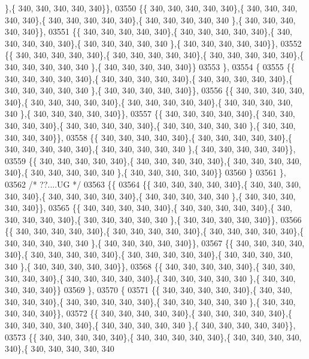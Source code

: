 \begin{DoxyCode}
      \},\{ 340, 340, 340, 340, 340\}\},
03550 \{\{ 340, 340, 340, 340, 340\},\{ 340, 340, 340, 340, 340\},\{ 340, 340, 340, 340, 340\},\{ 340, 340, 340, 340, 340
      \},\{ 340, 340, 340, 340, 340\}\},
03551 \{\{ 340, 340, 340, 340, 340\},\{ 340, 340, 340, 340, 340\},\{ 340, 340, 340, 340, 340\},\{ 340, 340, 340, 340, 340
      \},\{ 340, 340, 340, 340, 340\}\},
03552 \{\{ 340, 340, 340, 340, 340\},\{ 340, 340, 340, 340, 340\},\{ 340, 340, 340, 340, 340\},\{ 340, 340, 340, 340, 340
      \},\{ 340, 340, 340, 340, 340\}\}
03553 \},
03554 \{
03555 \{\{ 340, 340, 340, 340, 340\},\{ 340, 340, 340, 340, 340\},\{ 340, 340, 340, 340, 340\},\{ 340, 340, 340, 340, 340
      \},\{ 340, 340, 340, 340, 340\}\},
03556 \{\{ 340, 340, 340, 340, 340\},\{ 340, 340, 340, 340, 340\},\{ 340, 340, 340, 340, 340\},\{ 340, 340, 340, 340, 340
      \},\{ 340, 340, 340, 340, 340\}\},
03557 \{\{ 340, 340, 340, 340, 340\},\{ 340, 340, 340, 340, 340\},\{ 340, 340, 340, 340, 340\},\{ 340, 340, 340, 340, 340
      \},\{ 340, 340, 340, 340, 340\}\},
03558 \{\{ 340, 340, 340, 340, 340\},\{ 340, 340, 340, 340, 340\},\{ 340, 340, 340, 340, 340\},\{ 340, 340, 340, 340, 340
      \},\{ 340, 340, 340, 340, 340\}\},
03559 \{\{ 340, 340, 340, 340, 340\},\{ 340, 340, 340, 340, 340\},\{ 340, 340, 340, 340, 340\},\{ 340, 340, 340, 340, 340
      \},\{ 340, 340, 340, 340, 340\}\}
03560 \}
03561 \},
03562 \textcolor{comment}{/* ??....UG */}
03563 \{\{
03564 \{\{ 340, 340, 340, 340, 340\},\{ 340, 340, 340, 340, 340\},\{ 340, 340, 340, 340, 340\},\{ 340, 340, 340, 340, 340
      \},\{ 340, 340, 340, 340, 340\}\},
03565 \{\{ 340, 340, 340, 340, 340\},\{ 340, 340, 340, 340, 340\},\{ 340, 340, 340, 340, 340\},\{ 340, 340, 340, 340, 340
      \},\{ 340, 340, 340, 340, 340\}\},
03566 \{\{ 340, 340, 340, 340, 340\},\{ 340, 340, 340, 340, 340\},\{ 340, 340, 340, 340, 340\},\{ 340, 340, 340, 340, 340
      \},\{ 340, 340, 340, 340, 340\}\},
03567 \{\{ 340, 340, 340, 340, 340\},\{ 340, 340, 340, 340, 340\},\{ 340, 340, 340, 340, 340\},\{ 340, 340, 340, 340, 340
      \},\{ 340, 340, 340, 340, 340\}\},
03568 \{\{ 340, 340, 340, 340, 340\},\{ 340, 340, 340, 340, 340\},\{ 340, 340, 340, 340, 340\},\{ 340, 340, 340, 340, 340
      \},\{ 340, 340, 340, 340, 340\}\}
03569 \},
03570 \{
03571 \{\{ 340, 340, 340, 340, 340\},\{ 340, 340, 340, 340, 340\},\{ 340, 340, 340, 340, 340\},\{ 340, 340, 340, 340, 340
      \},\{ 340, 340, 340, 340, 340\}\},
03572 \{\{ 340, 340, 340, 340, 340\},\{ 340, 340, 340, 340, 340\},\{ 340, 340, 340, 340, 340\},\{ 340, 340, 340, 340, 340
      \},\{ 340, 340, 340, 340, 340\}\},
03573 \{\{ 340, 340, 340, 340, 340\},\{ 340, 340, 340, 340, 340\},\{ 340, 340, 340, 340, 340\},\{ 340, 340, 340, 340, 340

\end{DoxyCode}
